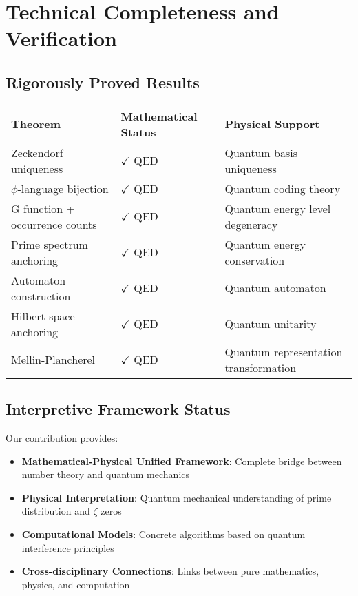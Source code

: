 \documentclass[12pt]{article}
\theoremstyle{plain}
\theoremstyle{definition}
\begin{document}
\section{Technical Completeness and Verification}

\subsection{Rigorously Proved Results}
\begin{center}
\renewcommand{\arraystretch}{1.3}
{\small
\begin{tabular}{|p{4.5cm}|p{3.5cm}|p{5.5cm}|}
\hline
\textbf{Theorem} & \textbf{Mathematical Status} & \textbf{Physical Support} \\
\hline
Zeckendorf uniqueness & $\checkmark$ QED & Quantum basis uniqueness \\
\hline
$\phi$-language bijection & $\checkmark$ QED & Quantum coding theory \\
\hline
G function + occurrence counts & $\checkmark$ QED & Quantum energy level degeneracy \\
\hline
Prime spectrum anchoring & $\checkmark$ QED & Quantum energy conservation \\
\hline
Automaton construction & $\checkmark$ QED & Quantum automaton \\
\hline
Hilbert space anchoring & $\checkmark$ QED & Quantum unitarity \\
\hline
Mellin-Plancherel & $\checkmark$ QED & Quantum representation transformation \\
\hline
\end{tabular}
}
\end{center}

\subsection{Interpretive Framework Status}

Our contribution provides:
\begin{itemize}
\item \textbf{Mathematical-Physical Unified Framework}: Complete bridge between number theory and quantum mechanics
\item \textbf{Physical Interpretation}: Quantum mechanical understanding of prime distribution and $\zeta$ zeros
\item \textbf{Computational Models}: Concrete algorithms based on quantum interference principles
\item \textbf{Cross-disciplinary Connections}: Links between pure mathematics, physics, and computation
\end{itemize}
\end{document}
